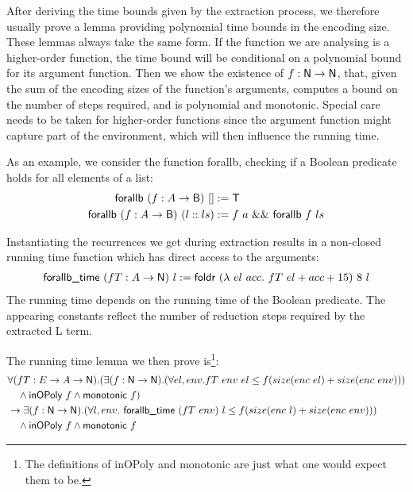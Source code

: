 \documentclass[a4paper,UKenglish,cleveref, autoref]{lipics-v2019}
\begin{document}
After deriving the time bounds given by the extraction process, we therefore usually prove a lemma providing polynomial time bounds in the encoding size. These lemmas always take the same form. If the function we are analysing is a higher-order function, the time bound will be conditional on a polynomial bound for its argument function. Then we show the existence of $f : \mathsf{N} \rightarrow \mathsf{N}$, that, given the sum of the encoding sizes of the function's arguments, computes a bound on the number of steps required, and is polynomial and monotonic. Special care needs to be taken for higher-order functions since the argument function might capture part of the environment, which will then influence the running time. 

As an example, we consider the function \textsf{forallb}, checking if a Boolean predicate holds for all elements of a list:
\begin{align*}
  \textsf{forallb}~(f : A \rightarrow \textsf{B})~[] &:= \mathsf{T} \\
  \textsf{forallb}~(f : A \rightarrow \textsf{B})~(l::ls) &:= {f~a}~\&\&~{\textsf{forallb}~f~ls}
\end{align*}

Instantiating the recurrences we get during extraction results in a non-closed running time function which has direct access to the arguments:
\begin{align*}
  \textsf{forallb\_time}~(fT : A \rightarrow \mathsf{N})~l := \textsf{foldr}~(\lambda~el~acc.~fT~el + acc + 15)~8~l 
\end{align*}
The running time depends on the running time of the Boolean predicate. The appearing constants reflect the number of reduction steps required by the extracted L term.

The running time lemma we then prove is\footnote{The definitions of \textsf{inOPoly} and \textsf{monotonic} are just what one would expect them to be.}:
\begin{alignat*}{1}
  &\forall (fT : E \rightarrow A \rightarrow \mathsf{N}). (\exists (f : \mathsf{N} \rightarrow \mathsf{N}). (\forall el, env. fT~env~el \le f(size(enc~el) + size(enc~env))) \\
  & \quad \land \textsf{inOPoly}~f \land \textsf{monotonic}~f) \\
  &\rightarrow \exists (f : \mathsf{N} \rightarrow \mathsf{N}). (\forall l, env.~\textsf{forallb\_time}~(fT~env)~l \le f(size(enc~l) + size(enc~env))) \\
  &\quad \land \textsf{inOPoly}~f \land \textsf{monotonic}~f
\end{alignat*}
\end{document}
